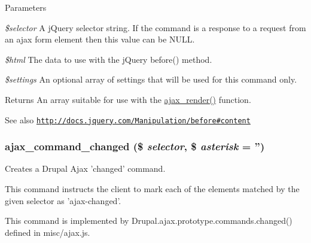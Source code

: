 \begin{DoxyParams}{Parameters}
\item[{\em \$selector}]A jQuery selector string. If the command is a response to a request from an ajax form element then this value can be NULL. \item[{\em \$html}]The data to use with the jQuery before() method. \item[{\em \$settings}]An optional array of settings that will be used for this command only.\end{DoxyParams}
\begin{DoxyReturn}{Returns}
An array suitable for use with the \hyperlink{group__ajax_ga241c2426bdde049c55b05b7bf5d714a2}{ajax\_\-render()} function.
\end{DoxyReturn}
\begin{DoxySeeAlso}{See also}
\href{http://docs.jquery.com/Manipulation/before#content}{\tt http://docs.jquery.com/Manipulation/before\#content} 
\end{DoxySeeAlso}
\hypertarget{group__ajax__commands_ga64ba8a2e560b17e4fc8ca090a37314a0}{
\subsubsection[{ajax\_\-command\_\-changed}]{\setlength{\rightskip}{0pt plus 5cm}ajax\_\-command\_\-changed (\$ {\em selector}, \/  \$ {\em asterisk} = {\ttfamily ''})}}
\label{group__ajax__commands_ga64ba8a2e560b17e4fc8ca090a37314a0}
Creates a Drupal Ajax 'changed' command.

This command instructs the client to mark each of the elements matched by the given selector as 'ajax-\/changed'.

This command is implemented by Drupal.ajax.prototype.commands.changed() defined in misc/ajax.js.


